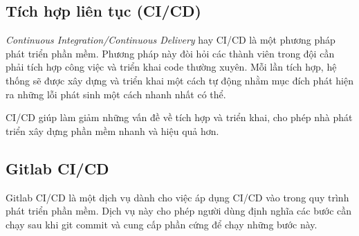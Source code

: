 \documentclass[./../main.tex]{subfiles}
\begin{document}
\hypertarget{tuxedch-hux1ee3p-liuxean-tux1ee5c-cicd}{%
\subsection{Tích hợp liên tục
(CI/CD)}\label{tuxedch-hux1ee3p-liuxean-tux1ee5c-cicd}}

\emph{Continuous Integration/Continuous Delivery} hay CI/CD là một
phương pháp phát triển phần mềm. Phương pháp này đòi hỏi các thành viên
trong đội cần phải tích hợp công việc và triển khai code thường xuyên.
Mỗi lần tích hợp, hệ thống sẽ được xây dựng và triển khai một cách tự
động nhằm mục đích phát hiện ra những lỗi phát sinh một cách nhanh nhất
có thể.

CI/CD giúp làm giảm những vấn đề về tích hợp và triển khai, cho phép nhà
phát triển xây dựng phần mềm nhanh và hiệu quả hơn.

\hypertarget{gitlab-cicd}{%
\subsection{Gitlab CI/CD}\label{gitlab-cicd}}

Gitlab CI/CD \cite{Git22} là một dịch vụ dành cho việc áp dụng CI/CD vào trong quy
trình phát triển phần mềm. Dịch vụ này cho phép người dùng định nghĩa
các bước cần chạy sau khi git commit và cung cấp phần cứng để chạy những
bước này.
\end{document}
